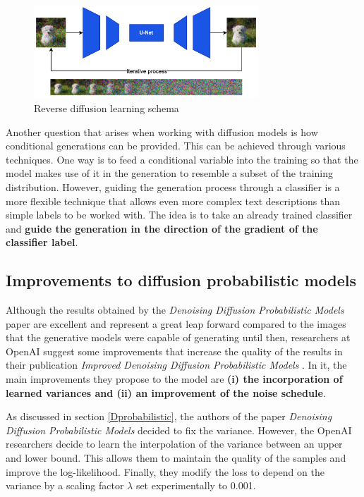 \begin{figure}
    \centering
    \includegraphics[width=0.75\textwidth]{Pictures/ReverseDP.png} 
    \caption{Reverse diffusion learning schema}
    \label{fig:ReverseDP}
\end{figure}

Another question that arises when working with diffusion models is how conditional generations can be provided. This can be achieved through various techniques. One way is to feed a conditional variable into the training so that the model makes use of it in the generation to resemble a subset of the training distribution. However, guiding the generation process through a classifier is a more flexible technique that allows even more complex text descriptions than simple labels to be worked with. The idea is to take an already trained classifier and \textbf{guide the generation in the direction of the gradient of the classifier label}.

\subsection{Improvements to diffusion probabilistic models }

Although the results obtained by the \textit{Denoising Diffusion Probabilistic Models} \cite{ho2020denoising} paper are excellent and represent a great leap forward compared to the images that the generative models were capable of generating until then, researchers at OpenAI suggest some improvements that increase the quality of the results in their publication \textit{Improved Denoising Diffusion Probabilistic Models} \cite{nichol2021improved}. In it, the main improvements they propose to the model are \textbf{(i) the incorporation of learned variances and (ii) an improvement of the noise schedule}. 

As discussed in section \ref{Dprobabilistic}, the authors of the paper \textit{Denoising Diffusion Probabilistic Models} \cite{ho2020denoising} decided to fix the variance. However, the OpenAI researchers decide to learn the interpolation of the variance between an upper and lower bound. This allows them to maintain the quality of the samples and improve the log-likelihood. Finally, they modify the loss to depend on the variance by a scaling factor $\lambda$ set experimentally to 0.001.

